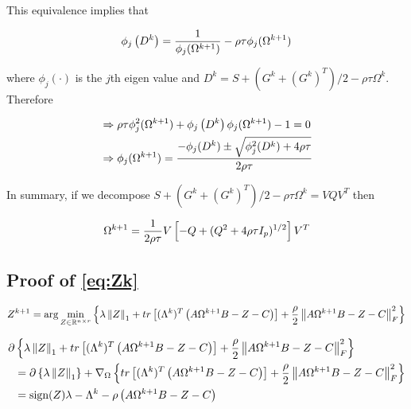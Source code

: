 \documentclass[11pt,]{report}
\begin{document}
This equivalence implies that

\begin{equation}
\phi_{j}\left( D^{k} \right) = \frac{1}{\phi_{j}(\Omega^{k + 1})} - \rho\tau\phi_{j}(\Omega^{k + 1}) \notag
\end{equation}

where \(\phi_{j}(\cdot)\) is the \(j\)th eigen value and \(D^{k} = S + \left(G^{k} + (G^{k})^{T}\right)/2 - \rho\tau\Omega^{k}\). Therefore

\begin{equation}
\begin{split}
  &\Rightarrow \rho\tau\phi_{j}^{2}(\Omega^{k + 1}) + \phi_{j}\left( D^{k} \right)\phi_{j}(\Omega^{k + 1}) - 1 = 0 \\
  &\Rightarrow \phi_{j}(\Omega^{k + 1}) = \frac{-\phi_{j}(D^{k}) \pm \sqrt{\phi_{j}^{2}(D^{k}) + 4\rho\tau}}{2\rho\tau}
\end{split}
\notag
\end{equation}

In summary, if we decompose \(S + \left(G^{k} + (G^{k})^{T}\right)/2 - \rho\tau\Omega^{k} = VQV^{T}\) then

\begin{equation}
\Omega^{k + 1} = \frac{1}{2\rho\tau}V\left[ -Q + (Q^{2} + 4\rho\tau I_{p})^{1/2}\right] V^{T}
\label{eq:appendixomegaproof2}\notag
\end{equation}

\hypertarget{proofZk}{%
\subsection{Proof of \eqref{eq:Zk}}\label{proofZk}}

\begin{equation}
Z^{k + 1} = \arg\min_{Z \in \mathbb{R}^{n \times r}}\left\{ \lambda\left\| Z \right\|_{1} + tr\left[(\Lambda^{k})^{T}\left(A\Omega^{k + 1}B - Z - C\right)\right] + \frac{\rho}{2}\left\| A\Omega^{k + 1}B - Z - C \right\|_{F}^{2} \right\}
\label{eq:appendixZZloglik2}\notag
\end{equation}

\begin{equation}
\begin{split}
  \partial&\left\{ \lambda\left\| Z \right\|_{1} + tr\left[(\Lambda^{k})^{T}\left(A\Omega^{k + 1}B - Z - C\right)\right] + \frac{\rho}{2}\left\| A\Omega^{k + 1}B - Z - C \right\|_{F}^{2} \right\} \\
  &= \partial\left\{ \lambda\left\| Z \right\|_{1} \right\} + \nabla_{\Omega}\left\{ tr\left[(\Lambda^{k})^{T}\left(A\Omega^{k + 1}B - Z - C\right)\right] + \frac{\rho}{2}\left\| A\Omega^{k + 1}B - Z - C \right\|_{F}^{2} \right\} \\
  &= \mbox{sign}(Z)\lambda - \Lambda^{k} - \rho\left( A\Omega^{k + 1}B - Z - C \right)
\label{eq:appendixZZgradient2}\notag
\end{split}
\end{equation}
\end{document}
